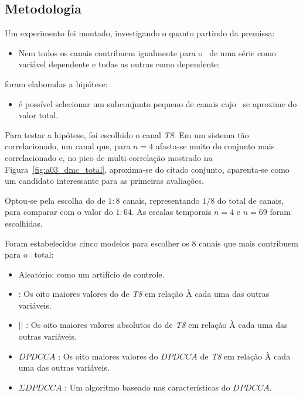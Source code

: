  

\subsection{Metodologia}

Um experimento foi montado, investigando o quanto partindo da premissa:

\begin{itemize}
  \item Nem todos os canais contribuem igualmente para o \dmc~de uma série como variável dependente e todas as outras como dependente;

\end{itemize}

foram elaboradas a hipótese:

\begin{itemize}
  \item é possível selecionar um subconjunto pequeno de canais cujo \dmc~se aproxime do valor total.
\end{itemize}

Para testar a hipótese, foi escolhido o canal \emph{T8}. Em um sistema tão correlacionado, um canal que, para $n=4$ afasta-se muito do conjunto mais correlacionado e, no pico de multi-correlação mostrado na Figura~\ref{fig:a03_dmc_total}, aproxima-se do citado conjunto, aparenta-se como um candidato interessante para as primeiras avaliações.

Optou-se pela escolha do \dmc de $1:8$ canais, representando $1/8$ do total de canais, para comparar com o valor do \dmc$1:64$. As escalas temporais $n=4$ e $n=69$ foram escolhidas.

Foram estabelecidos cinco modelos para escolher os 8 canais que mais contribuem para o \dmc~total:

\begin{itemize}
  \item Aleatório: como um artifício de controle.
  \item \pdcca : Os oito maiores valores do \pdcca de \emph{T8} em relação À cada uma das outras variáveis.
  \item $|$\pdcca$|$ : Os oito maiores valores absolutos do \pdcca de \emph{T8} em relação À cada uma das outras variáveis.
  \item $DPDCCA$ : Os oito maiores valores do $DPDCCA$ de \emph{T8} em relação À cada uma das outras variáveis.
  \item $\Sigma DPDCCA$ : Um algoritmo baseado nas características do $DPDCCA$.  
\end{itemize}



